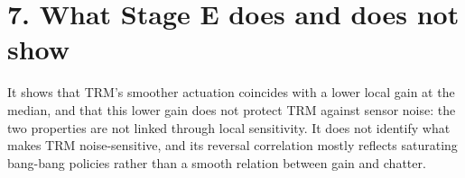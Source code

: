 \documentclass[11pt]{article}
\begin{document}
\section*{7. What Stage E does and does not show}



It shows that TRM's smoother actuation coincides with a lower local gain at the median, and that this lower gain does not protect TRM against sensor noise: the two properties are not linked through local sensitivity. It does not identify what makes TRM noise-sensitive, and its reversal correlation mostly reflects saturating bang-bang policies rather than a smooth relation between gain and chatter.
\end{document}
